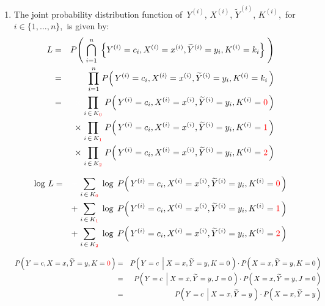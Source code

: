 \proof
\begin{enumerate}
\item
The joint probability distribution function of
\,$Y^{(i)}$, $X^{(i)}$, $\widetilde{Y}^{(i)}$, $K^{(i)}$,
\,for \,$i \in \{1,\ldots,n\}$,
\,is given by:
\begin{eqnarray*}
L &=&
	P\!\left(\;
		\overset{n}{\underset{i=1}{\bigcap}}\;
		\left\{
			Y^{(i)}=c_{i},X^{(i)}=x^{(i)},\widetilde{Y}^{(i)}=y_{i},K^{(i)}=k_{i}
		\right\}
	\;\right)
\\
&=&
	\overset{n}{\underset{i=1}{\prod}} \;
	P\!\left(\,Y^{(i)}=c_{i},X^{(i)}=x^{(i)},\widetilde{Y}^{(i)}=y_{i},K^{(i)}=k_{i}\,\right)
\\
&=&
	{\color{white}\times}\;
	\underset{i\,\in\,K_{\color{red}0}}{\prod} \;
	P\!\left(\,Y^{(i)}=c_{i},X^{(i)}=x^{(i)},\widetilde{Y}^{(i)}=y_{i},K^{(i)}={\color{red}0}\,\right)
\\
&&
	\times\;
	\underset{i\,\in\,K_{\color{red}1}}{\prod} \;
	P\!\left(\,Y^{(i)}=c_{i},X^{(i)}=x^{(i)},\widetilde{Y}^{(i)}=y_{i},K^{(i)}={\color{red}1}\,\right)
\\
&&
	\times\;
	\underset{i\,\in\,K_{\color{red}2}}{\prod} \;
	P\!\left(\,Y^{(i)}=c_{i},X^{(i)}=x^{(i)},\widetilde{Y}^{(i)}=y_{i},K^{(i)}={\color{red}2}\,\right)
\end{eqnarray*}

\begin{eqnarray*}
\log\,L
&=&
	{\color{white}+}\;
	\underset{i\,\in\,K_{\color{red}0}}{\sum} \;
	\log \;
	P\!\left(\,Y^{(i)}=c_{i},X^{(i)}=x^{(i)},\widetilde{Y}^{(i)}=y_{i},K^{(i)}={\color{red}0}\,\right)
\\
&&
	+\;
	\underset{i\,\in\,K_{\color{red}1}}{\sum} \;
	\log\;
	P\!\left(\,Y^{(i)}=c_{i},X^{(i)}=x^{(i)},\widetilde{Y}^{(i)}=y_{i},K^{(i)}={\color{red}1}\,\right)
\\
&&
	+\;
	\underset{i\,\in\,K_{\color{red}2}}{\sum} \;
	\log\;
	P\!\left(\,Y^{(i)}=c_{i},X^{(i)}=x^{(i)},\widetilde{Y}^{(i)}=y_{i},K^{(i)}={\color{red}2}\,\right)
\end{eqnarray*}

\begin{eqnarray*}
P\!\left(\,Y=c,X=x,\widetilde{Y}=y,K={\color{red}0}\,\right)
&=&
	P\!\left(\,Y=c \;\left\vert\; X=x,\widetilde{Y}=y,K=0\right.\,\right)
	\cdot
	P\!\left(\,X=x,\widetilde{Y}=y,K=0\,\right)
\\
&=&
	P\!\left(\,Y=c \;\left\vert\; X=x,\widetilde{Y}=y,J=0\right.\,\right)
	\cdot
	P\!\left(\,X=x,\widetilde{Y}=y,J=0\,\right)
\\
&=&
	P\!\left(\,Y=c \;\left\vert\; X=x,\widetilde{Y}=y\right.\,\right)
	\cdot
	P\!\left(\,X=x,\widetilde{Y}=y\,\right)
\end{eqnarray*}


\end{enumerate}
